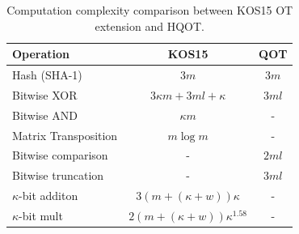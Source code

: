 


\begin{table}[t]
\centering
\begin{tabular}{lcc}
\toprule
Operation & KOS15 & QOT \\
\midrule
Hash (SHA-1)    & $3m$              & $3m$ \\ 
Bitwise XOR      & $3\kappa m + 3ml + \kappa$             & $3ml $  \\ 
Bitwise AND  & $\kappa m$              & -           \\ 
Matrix Transposition & $m\log m$              & -           \\ 
Bitwise comparison & -             & $2ml$           \\ 
Bitwise truncation & -            & $3ml$           \\ 
$\kappa$-bit additon & $3(m + (\kappa + w))\kappa$ & - \\ 
$\kappa$-bit mult & $2(m + (\kappa + w))\kappa^{1.58}$ & - \\ 
\bottomrule
\end{tabular}
\caption{Computation complexity comparison between KOS15 OT extension and HQOT.}
\label{table:complexity}
\end{table}

